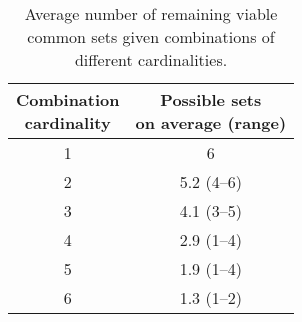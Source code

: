 \begin{table}[htbp]
\setlength{\tabcolsep}{4pt} %
\centering
\caption{Average number of remaining viable common sets given combinations of different cardinalities.}
\label{tab:avg-viable-sets}
\begin{tabular}{c c}
\toprule
\makecell[c]{Combination\\cardinality} &
\makecell[c]{Possible sets\\on average (range)} \\
\midrule
1 & 6 \\
2 & 5.2 (4--6) \\
3 & 4.1 (3--5) \\
4 & 2.9 (1--4) \\
5 & 1.9 (1--4) \\
6 & 1.3 (1--2) \\
\bottomrule
\end{tabular}
\end{table}